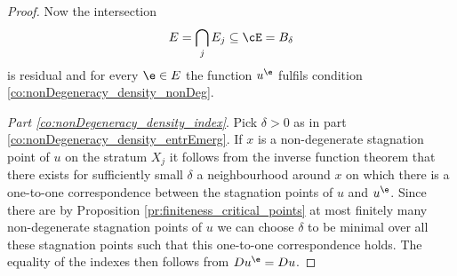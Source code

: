 \begin{proof}
  Now the intersection
  \begin{align*}
    E=\bigcap_j E_j\subseteq \cE =B_\delta
  \end{align*}
  is residual and
  for every $\e\in E$ the function $u^\e$ fulfils condition
  \ref{co:nonDegeneracy_density_nonDeg}.

  \emph{Part \ref{co:nonDegeneracy_density_index}}.
  Pick $\delta>0$ as in part \ref{co:nonDegeneracy_density_entrEmerg}.
  If $x$ is a non-degenerate stagnation point of $u$ on the stratum $X_j$ it follows 
  from the inverse function theorem that there exists for sufficiently small $\delta$
  a neighbourhood around $x$ on which there is a one-to-one correspondence between the
  stagnation points of $u$ and $u^\e$.
  Since there are by Proposition \ref{pr:finiteness_critical_points} at most finitely many non-degenerate stagnation points of
  $u$ we can choose $\delta$ to be minimal over all these stagnation points such that this one-to-one correspondence holds.
  The equality of the indexes then follows from $Du^\e=Du$.
\end{proof}



